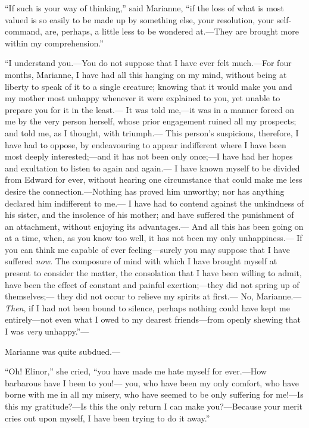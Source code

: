 ``If such is your way of thinking,'' said Marianne,
``if the loss of what is most valued is so easily
to be made up by something else, your resolution,
your self-command, are, perhaps, a little less to be
wondered at.---They are brought more within my comprehension.''

``I understand you.---You do not suppose that I have ever
felt much.---For four months, Marianne, I have had all this
hanging on my mind, without being at liberty to speak
of it to a single creature; knowing that it would make
you and my mother most unhappy whenever it were explained
to you, yet unable to prepare you for it in the least.---%
It was told me,---it was in a manner forced on me by the
very person herself, whose prior engagement ruined all
my prospects; and told me, as I thought, with triumph.---%
This person's suspicions, therefore, I have had to oppose,
by endeavouring to appear indifferent where I have been most
deeply interested;---and it has not been only once;---I have
had her hopes and exultation to listen to again and again.---%
I have known myself to be divided from Edward for ever,
without hearing one circumstance that could make me less
desire the connection.---Nothing has proved him unworthy;
nor has anything declared him indifferent to me.---%
I have had to contend against the unkindness of his sister,
and the insolence of his mother; and have suffered the
punishment of an attachment, without enjoying its advantages.---%
And all this has been going on at a time, when, as you
know too well, it has not been my only unhappiness.---%
If you can think me capable of ever feeling---surely you
may suppose that I have suffered \emph{now}.  The composure
of mind with which I have brought myself at present
to consider the matter, the consolation that I have been
willing to admit, have been the effect of constant and
painful exertion;---they did not spring up of themselves;---%
they did not occur to relieve my spirits at first.---%
No, Marianne.---\emph{Then}, if I had not been bound to silence,
perhaps nothing could have kept me entirely---not even what I
owed to my dearest friends---from openly shewing that I was
\emph{very} unhappy.''---%

Marianne was quite subdued.---%

``Oh! Elinor,'' she cried, ``you have made me hate
myself for ever.---How barbarous have I been to you!---%
you, who have been my only comfort, who have borne with me
in all my misery, who have seemed to be only suffering
for me!---Is this my gratitude?---Is this the only return I
can make you?---Because your merit cries out upon myself,
I have been trying to do it away.''


